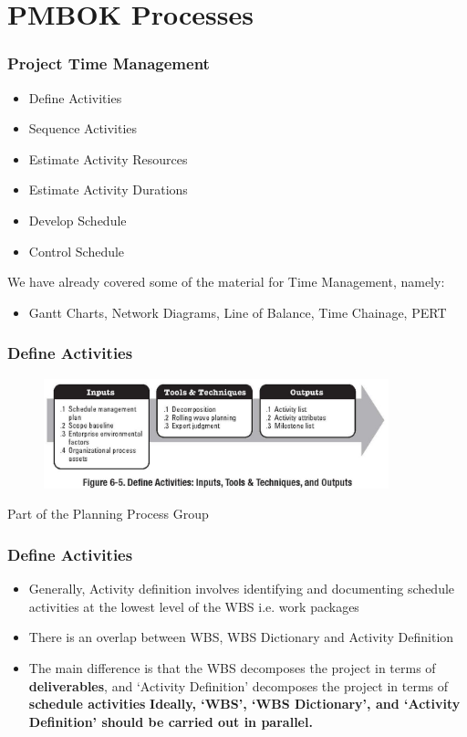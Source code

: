 \section{PMBOK Processes}


\begin{frame}
\frametitle{Project Time Management}
\begin{itemize}
	\item Define Activities
	\item Sequence Activities
	\item Estimate Activity Resources
	\item Estimate Activity Durations
	\item Develop Schedule
	\item Control Schedule
\end{itemize}

We have already covered some of the material for Time Management, namely:
\begin{itemize}
	\item Gantt Charts, Network Diagrams, Line of Balance, Time Chainage, PERT 
\end{itemize}

\end{frame}




\begin{frame}
\frametitle{Define Activities}
\begin{figure}
	\centering
		\includegraphics[width = 10cm]{images/Fig6-5.jpg}
	\label{fig:6-5}
\end{figure}
Part of the Planning Process Group
\end{frame}




\begin{frame}
\frametitle{Define Activities}
\begin{itemize}
	\item Generally, Activity definition involves identifying and documenting schedule activities at the lowest level of the WBS  i.e. work packages
	\item There is an overlap between WBS, WBS Dictionary and Activity Definition
	\item The main difference is that the WBS decomposes the project in terms of \textbf{deliverables}, and `Activity Definition' decomposes the project in terms of \textbf{schedule activities}
\textbf{Ideally, `WBS', `WBS Dictionary', and `Activity Definition' should be carried out in parallel.}
\end{itemize}
\end{frame}





